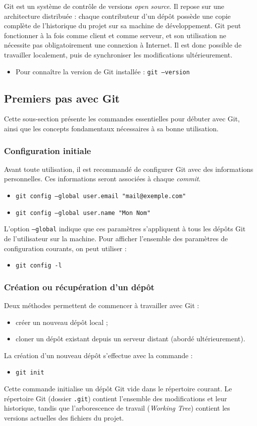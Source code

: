 \documentclass{article}
\begin{document}
Git est un système de contrôle de versions \emph{open source}. Il repose sur une architecture distribuée : chaque contributeur d’un dépôt possède une copie complète de l’historique du projet sur sa machine de développement.  
Git peut fonctionner à la fois comme client et comme serveur, et son utilisation ne nécessite pas obligatoirement une connexion à Internet. Il est donc possible de travailler localement, puis de synchroniser les modifications ultérieurement.
\begin{itemize}
    \item Pour connaître la version de Git installée : \texttt{git --version}
\end{itemize}

\subsection{Premiers pas avec Git}
Cette sous-section présente les commandes essentielles pour débuter avec Git, ainsi que les concepts fondamentaux nécessaires à sa bonne utilisation.
\subsubsection{Configuration initiale}
Avant toute utilisation, il est recommandé de configurer Git avec des informations personnelles. Ces informations seront associées à chaque \emph{commit}.
\begin{itemize}
    \item \texttt{git config --global user.email "mail@exemple.com"}
    \item \texttt{git config --global user.name "Mon Nom"}
\end{itemize}
L’option \texttt{--global} indique que ces paramètres s’appliquent à tous les dépôts Git de l’utilisateur sur la machine.
Pour afficher l’ensemble des paramètres de configuration courants, on peut utiliser :
\begin{itemize}
    \item \texttt{git config -l}
\end{itemize}
\subsubsection{Création ou récupération d’un dépôt}
Deux méthodes permettent de commencer à travailler avec Git :
\begin{itemize}
    \item créer un nouveau dépôt local ;
    \item cloner un dépôt existant depuis un serveur distant (abordé ultérieurement).
\end{itemize}
La création d’un nouveau dépôt s’effectue avec la commande :
\begin{itemize}
    \item \texttt{git init}
\end{itemize}
Cette commande initialise un dépôt Git vide dans le répertoire courant.
Le répertoire Git (dossier \texttt{.git}) contient l’ensemble des modifications et leur historique, tandis que l’arborescence de travail (\emph{Working Tree}) contient les versions actuelles des fichiers du projet.
\end{document}

